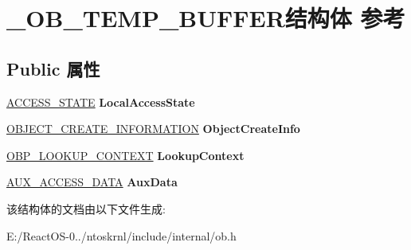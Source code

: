 \hypertarget{struct___o_b___t_e_m_p___b_u_f_f_e_r}{}\section{\+\_\+\+O\+B\+\_\+\+T\+E\+M\+P\+\_\+\+B\+U\+F\+F\+E\+R结构体 参考}
\label{struct___o_b___t_e_m_p___b_u_f_f_e_r}
\subsection*{Public 属性}
\begin{DoxyCompactItemize}
\item 
\mbox{\label{struct___o_b___t_e_m_p___b_u_f_f_e_r_aeb295df80e077156cf1d145ebe516433}} 
\hyperlink{struct___a_c_c_e_s_s___s_t_a_t_e}{A\+C\+C\+E\+S\+S\+\_\+\+S\+T\+A\+TE} {\bfseries Local\+Access\+State}
\item 
\mbox{\label{struct___o_b___t_e_m_p___b_u_f_f_e_r_a55f5dfeacbc3ff3827235f60adf70ae4}} 
\hyperlink{struct___o_b_j_e_c_t___c_r_e_a_t_e___i_n_f_o_r_m_a_t_i_o_n}{O\+B\+J\+E\+C\+T\+\_\+\+C\+R\+E\+A\+T\+E\+\_\+\+I\+N\+F\+O\+R\+M\+A\+T\+I\+ON} {\bfseries Object\+Create\+Info}
\item 
\mbox{\label{struct___o_b___t_e_m_p___b_u_f_f_e_r_a17e8bd1ef023d9f21ba54776466bbcd3}} 
\hyperlink{struct___o_b_p___l_o_o_k_u_p___c_o_n_t_e_x_t}{O\+B\+P\+\_\+\+L\+O\+O\+K\+U\+P\+\_\+\+C\+O\+N\+T\+E\+XT} {\bfseries Lookup\+Context}
\item 
\mbox{\label{struct___o_b___t_e_m_p___b_u_f_f_e_r_a7d744603d84237b0eb17003baa66b516}} 
\hyperlink{struct___a_u_x___a_c_c_e_s_s___d_a_t_a}{A\+U\+X\+\_\+\+A\+C\+C\+E\+S\+S\+\_\+\+D\+A\+TA} {\bfseries Aux\+Data}
\end{DoxyCompactItemize}


该结构体的文档由以下文件生成\+:\begin{DoxyCompactItemize}
\item 
E\+:/\+React\+O\+S-\/0../ntoskrnl/include/internal/ob.\+h\end{DoxyCompactItemize}
